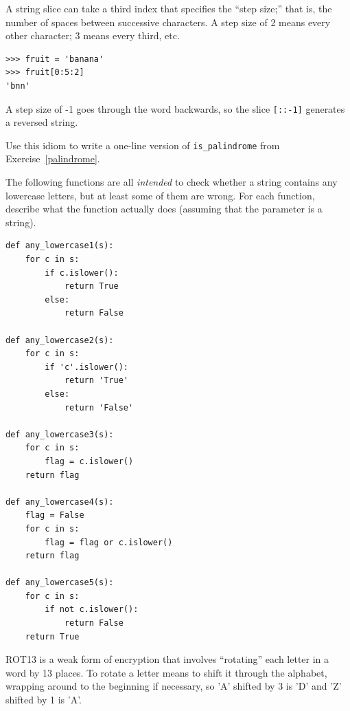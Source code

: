 \documentclass[10pt]{book}
\begin{document}
\begin{CJK}{UTF8}{gbsn}
\begin{exercise}

A string slice can take a third index that specifies the ``step
size;'' that is, the number of spaces between successive characters.
A step size of 2 means every other character; 3 means every third,
etc.

\begin{verbatim}
>>> fruit = 'banana'
>>> fruit[0:5:2]
'bnn'
\end{verbatim}

A step size of -1 goes through the word backwards, so
the slice \verb"[::-1]" generates a reversed string.

Use this idiom to write a one-line version of \verb"is_palindrome"
from Exercise~\ref{palindrome}.
\end{exercise}


\begin{exercise}

The following functions are all {\em intended} to check whether a
string contains any lowercase letters, but at least some of them are
wrong.  For each function, describe what the function actually does
(assuming that the parameter is a string).

\begin{verbatim}
def any_lowercase1(s):
    for c in s:
        if c.islower():
            return True
        else:
            return False

def any_lowercase2(s):
    for c in s:
        if 'c'.islower():
            return 'True'
        else:
            return 'False'

def any_lowercase3(s):
    for c in s:
        flag = c.islower()
    return flag

def any_lowercase4(s):
    flag = False
    for c in s:
        flag = flag or c.islower()
    return flag

def any_lowercase5(s):
    for c in s:
        if not c.islower():
            return False
    return True
\end{verbatim}

\end{exercise}


\begin{exercise}

\label{exrotate}
ROT13 is a weak form of encryption that involves ``rotating'' each
letter in a word by 13 places.  To rotate a letter means
to shift it through the alphabet, wrapping around to the beginning if
necessary, so 'A' shifted by 3 is 'D' and 'Z' shifted by 1 is 'A'.


\end{exercise}
\end{CJK}
\end{document}
